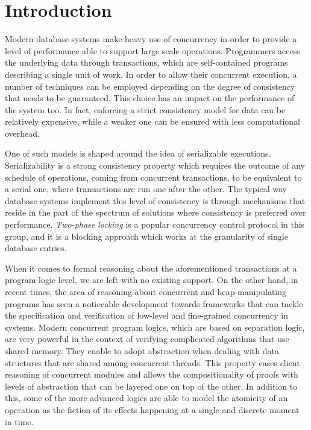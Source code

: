\section{Introduction}

Modern database systems make heavy use of concurrency in order to provide a level of performance able to support large scale operations. Programmers access the underlying data through transactions, which are self-contained programs describing a single unit of work. In order to allow their concurrent execution, a number of techniques can be employed depending on the degree of consistency that needs to be guaranteed. This choice has an impact on the performance of the system too. In fact, enforcing a strict consistency model for data can be relatively expensive, while a weaker one can be ensured with less computational overhead.

One of such models is shaped around the idea of serializable executions. Serializability is a strong consistency property which requires the outcome of any schedule of operations, coming from concurrent transactions, to be equivalent to a serial one, where transactions are run one after the other. The typical way database systems implement this level of consistency is through mechanisms that reside in the part of the spectrum of solutions where consistency is preferred over performance. \textit{Two-phase locking} is a popular concurrency control protocol in this group, and it is a blocking approach which works at the granularity of single database entries.

When it comes to formal reasoning about the aforementioned transactions at a program logic level, we are left with no existing support. On the other hand, in recent times, the area of reasoning about concurrent and heap-manipulating programs has seen a noticeable development towards frameworks that can tackle the specification and verification of low-level and fine-grained concurrency in systems. Modern concurrent program logics, which are based on separation logic, are very powerful in the context of verifying complicated algorithms that use shared memory. They enable to adopt abstraction when dealing with data structures that are shared among concurrent threads. This property eases client reasoning of concurrent modules and allows the compositionality of proofs with levels of abstraction that can be layered one on top of the other. In addition to this, some of the more advanced logics are able to model the atomicity of an operation as the fiction of its effects happening at a single and discrete moment in time.

